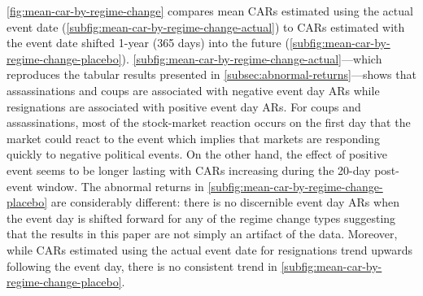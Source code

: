 \documentclass[12pt,final,fleqn]{article}
\theoremstyle{plain}
\begin{document}
\autoref{fig:mean-car-by-regime-change} compares mean CARs estimated using the actual event date (\autoref{subfig:mean-car-by-regime-change-actual}) to CARs estimated with the event date shifted 1-year (365 days) into the future (\autoref{subfig:mean-car-by-regime-change-placebo}). \autoref{subfig:mean-car-by-regime-change-actual}---which reproduces the tabular results presented in \autoref{subsec:abnormal-returns}---shows that assassinations and coups are associated with negative event day ARs while resignations are associated with positive event day ARs. For coups and assassinations, most of the stock-market reaction occurs on the first day that the market could react to the event which implies that markets are responding quickly to negative political events. On the other hand, the effect of positive event seems to be longer lasting with CARs increasing during the 20-day post-event window. The abnormal returns in \autoref{subfig:mean-car-by-regime-change-placebo} are considerably different: there is no discernible event day ARs when the event day is shifted forward for any of the regime change types suggesting that the results in this paper are not simply an artifact of the data. Moreover, while CARs estimated using the actual event date for resignations trend upwards following the event day, there is no consistent trend in \autoref{subfig:mean-car-by-regime-change-placebo}.  
\end{document}
